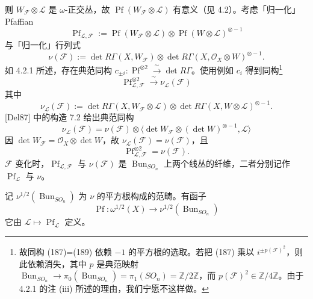 则 $W_{\mathcal{F}}\otimes\mathcal{L}$ 是 $\omega$-正交丛，故 $\operatorname{Pf}(W_{\mathcal{F}}\otimes\mathcal{L})$ 有意义（见 4.2）。考虑「归一化」Pfaffian
\begin{equation}\tag{185}
\operatorname{Pf}_{\mathcal{L},\mathcal{F}}:=\operatorname{Pf}(W_{\mathcal{F}}\otimes\mathcal{L})\otimes\operatorname{Pf}(W\otimes\mathcal{L})^{\otimes-1}
\end{equation}
与「归一化」行列式
\begin{equation}\tag{186}
\nu(\mathcal{F}):=\det R\Gamma(X,W_{\mathcal{F}})\otimes\det R\Gamma(X,\mathcal{O}_{X}\otimes W)^{\otimes-1}.
\end{equation}
如 4.2.1 所述，存在典范同构 $c_{\pm i}:\operatorname{Pf}^{\otimes 2}\xrightarrow{\ \sim\ }\det R\Gamma$。使用例如 $c_{i}$ 得到同构\footnote{故同构 (187)=(189) 依赖 $-1$ 的平方根的选取。若把 (187) 乘以 $i^{\pm p(\mathcal{F})^{2}}$，则此依赖消失，其中 $p$ 是典范映射 $\operatorname{Bun}_{SO_{n}}\to\pi_{0}(\operatorname{Bun}_{SO_{n}})=\pi_{1}(SO_{n})=\mathbb{Z}/2\mathbb{Z}$，而 $p(\mathcal{F})^{2}\in\mathbb{Z}/4\mathbb{Z}$。由于 4.2.1 的注 (iii) 所述的理由，我们宁愿不这样做。}
\begin{equation}\tag{187}
\operatorname{Pf}_{\mathcal{L},\mathcal{F}}^{\otimes 2}\xrightarrow{\ \sim\ }\nu_{\mathcal{L}}(\mathcal{F})
\end{equation}
其中
\begin{equation}\tag{188}
\nu_{\mathcal{L}}(\mathcal{F}):=\det R\Gamma(X,W_{\mathcal{F}}\otimes\mathcal{L})\otimes\det R\Gamma(X,W\otimes\mathcal{L})^{\otimes-1}.
\end{equation}
[Del87] 中的构造 7.2 给出典范同构
\[
\nu_{\mathcal{L}}(\mathcal{F})=\nu(\mathcal{F})\otimes\langle\det W_{\mathcal{F}}\otimes(\det W)^{\otimes-1},\mathcal{L}\rangle
\]
因 $\det W_{\mathcal{F}}=\mathcal{O}_{X}\otimes\det W$，故 $\nu_{\mathcal{L}}(\mathcal{F})=\nu(\mathcal{F})$，且
\begin{equation}\tag{189}
\operatorname{Pf}_{\mathcal{L},\mathcal{F}}^{\otimes 2}=\nu(\mathcal{F}).
\end{equation}
$\mathcal{F}$ 变化时，$\operatorname{Pf}_{\mathcal{L},\mathcal{F}}$ 与 $\nu(\mathcal{F})$ 是 $\operatorname{Bun}_{SO_{n}}$ 上两个线丛的纤维，二者分别记作 $\operatorname{Pf}_{\mathcal{L}}$ 与 $\nu$。

记 $\nu^{1/2}(\operatorname{Bun}_{SO_{n}})$ 为 $\nu$ 的平方根构成的范畴。有函子
\begin{equation}\tag{190}
\operatorname{Pf}:\omega^{1/2}(X)\to\nu^{1/2}(\operatorname{Bun}_{SO_{n}})
\end{equation}
它由 $\mathcal{L}\mapsto\operatorname{Pf}_{\mathcal{L}}$ 定义。

